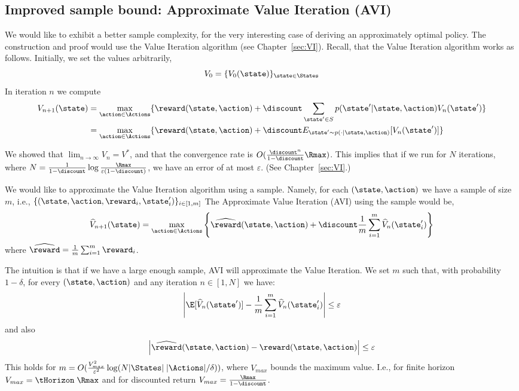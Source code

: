 \subsection{Improved sample bound: Approximate Value
Iteration (AVI)}

We would like to exhibit a better sample complexity, for the very
interesting case of deriving an approximately optimal policy. The
construction and proof would use the Value Iteration algorithm (see
Chapter~\ref{sec:VI}).
%
Recall, that the Value Iteration algorithm works as follows.
Initially, we set the values arbitrarily,
\[
V_0=\{V_0(\state)\}_{\state \in \States}
\]
In iteration $n$ we compute
\begin{align*}
V_{n+1}(\state)&=\max_{\action\in \Actions} \{
\reward(\state,\action)+\discount \sum_{\state'\in S}
p(\state'|\state,\action)
V_n(\state')\}\\
&=\max_{\action\in \Actions} \{ \reward(\state,\action)+\discount
E_{\state'\sim p(\cdot |\state,\action)} [V_n(\state')]\}
\end{align*}

We showed that $\lim_{n\rightarrow \infty}V_n =V^*$, and that the
convergence rate is $O(\frac{\discount^n}{1-\discount}\Rmax)$.
%
This implies that if we run for $N$ iterations, where
$N=\frac{1}{1-\discount}\log
\frac{\Rmax}{\varepsilon(1-\discount)}$, we have an error of at most
$\varepsilon$. (See Chapter~\ref{sec:VI}.)


We would like to approximate the Value Iteration algorithm using a
sample. Namely, for each $(\state,\action)$ we have a sample of size
$m$, i.e., $\{(\state,\action,\reward_i,\state'_i)\}_{i\in[1,m]}$
The Approximate Value Iteration (AVI) using the sample would be,
\[
\widehat{V}_{n+1}(\state)=\max_{\action\in \Actions} \left\{
\widehat{\reward}(\state,\action)+\discount \frac{1}{m}\sum_{i=1}^m
\widehat{V}_n(\state'_i)\right\}
\]
where $\widehat{\reward}=\frac{1}{m}\sum_{i=1}^m \reward_i$.

The intuition is that if we have a large enough sample, AVI  will
approximate the Value Iteration. We set $m$ such that, with
probability $1-\delta$, for every $(\state,\action)$ and any
iteration $n\in[1,N]$ we have:
\[
\left|\E[\widehat{V}_n(\state')]-\frac{1}{m}\sum_{i=1}^m
\widehat{V}_n(\state'_i)\right|\leq \varepsilon
\]
and also
\[
\left|\widehat{\reward}(\state,\action)-\reward(\state,\action)\right|\leq\varepsilon
\]
This holds for $m=O(\frac{V^2_{max}}{\varepsilon^2}\log (N
|\States|\;|\Actions|/\delta))$, where $V_{max}$ bounds the maximum
value. I.e., for finite horizon $V_{max}=\tHorizon\; \Rmax$ and for
discounted return $V_{max}=\frac{\Rmax}{1-\discount}$.

